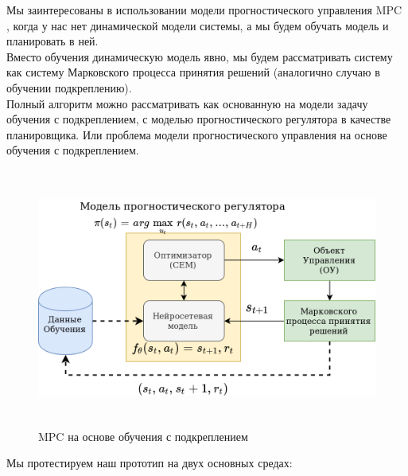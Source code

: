 \documentclass[a4paper,12pt]{article}
\begin{document}
Мы заинтересованы в использовании модели прогностического управления MPC , когда у нас нет динамической модели системы, а мы будем обучать модель и планировать в ней.\\

Вместо обучения динамическую модель явно, мы будем рассматривать систему как систему Марковского процесса принятия решений (аналогично случаю в обучении подкреплению).\\

Полный алгоритм можно рассматривать как основанную на модели задачу обучения с подкреплением, с моделью прогностического регулятора в качестве планировщика. Или проблема модели прогностического управления на основе обучения с подкреплением.\\

\begin{figure}[H]
    \centering
    \includegraphics[height=8.5cm]{img/mpc_ru.png}
    \caption{MPC на основе обучения с подкреплением}
    \label{fig:my_label}
\end{figure}
\newpage
Мы протестируем наш прототип на двух основных средах:
\end{document}
